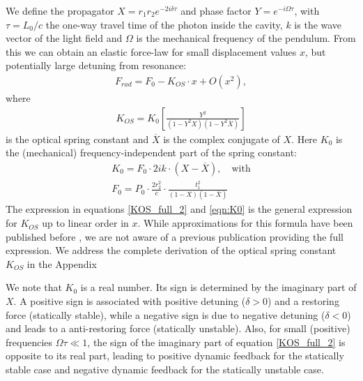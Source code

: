 We define the propagator $X=r_1r_2e^{-2i\delta\tau}$ and phase factor $Y=e^{-i\Omega\tau}$, with $\tau=L_0/c$ the one-way
travel time of the photon inside the cavity, $k$ is the wave vector of the light field  and $\Omega$ 
is the mechanical frequency of the pendulum. From this we can obtain an elastic force-law for small displacement values $x$, but potentially large detuning from resonance:
\begin{eqnarray}
\label{eqn:Frd}
F_{rad}=F_0-K_{OS}\cdot x + O(x^2),
\end{eqnarray}
where
\begin{eqnarray}
\label{KOS_full_2}
K_{OS}=K_0\left [ \frac{Y^2}{(1-Y^2X)(1-Y^2\overline{X})}  \right ]
\end{eqnarray}
is the optical spring constant and $\overline{X}$ is the complex conjugate of $X$. Here $K_0$ is the 
(mechanical) frequency-independent part of the spring constant:
\begin{eqnarray}
\label{eqn:K0}
K_0=F_0 \cdot 2 i k \cdot (X-\overline{X}),   \quad \mbox{with}\nonumber\\ 
F_0 = P_0 \cdot \frac{2  r_2^2}{c} \cdot \frac{t_1^2}{(1-X)(1-\overline{X})}
\end{eqnarray}
The expression in equations \ref{KOS_full_2} and \ref{eqn:K0}
is the general expression for $K_{OS}$ up to linear order in $x$. While approximations for this formula have been published before \cite{Barginsky02}, we are not aware of a previous publication providing the full expression.
We address the complete derivation of the optical spring constant $K_{OS}$ in the Appendix%

We note that $K_0$ is a real number. Its sign is determined by the imaginary part of $X$. A positive sign is associated with positive detuning ($\delta>0$) and a restoring force (statically stable),  while a negative sign is due to  negative detuning ($\delta<0$) and
leads to a anti-restoring force  (statically unstable).  Also, for small (positive) frequencies $\Omega\tau\ll1$, the sign of the imaginary part of equation \ref{KOS_full_2} is opposite to its real part, leading to positive dynamic feedback for the statically stable case and  negative dynamic feedback for the statically unstable case.

